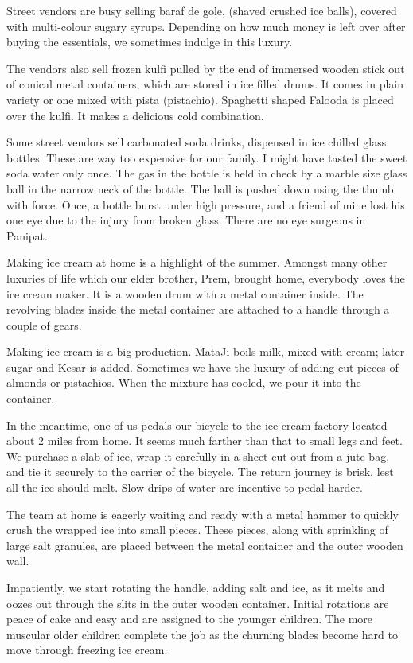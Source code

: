 Street vendors are busy selling baraf de gole, (shaved crushed ice balls),
covered with multi-colour sugary syrups. Depending on how much money is
left over after buying the essentials, we sometimes indulge in this
luxury. 
 
The vendors also sell frozen kulfi pulled by the end of immersed wooden
stick out of conical metal containers, which are stored in ice filled
drums. It comes in plain variety or one mixed with pista (pistachio).
Spaghetti shaped Falooda is placed over the kulfi. It makes a delicious
cold combination. 
 
Some street vendors sell carbonated soda drinks, dispensed in ice chilled
glass bottles. These are way too expensive for our family. I might have
tasted the sweet soda water only once. The gas in the bottle is held in
check by a marble size glass ball in the narrow neck of the bottle. The
ball is pushed down using the thumb with force. Once, a bottle burst under
high pressure, and a friend of mine lost his one eye due to the injury
from broken glass. There are no eye surgeons in Panipat. 
 
Making ice cream at home is a highlight of the summer. Amongst many other
luxuries of life which our elder brother, Prem, brought home, everybody
loves the ice cream maker. It is a wooden drum with a metal container
inside. The revolving blades inside the metal container are attached to
a handle through a couple of gears.
 
Making ice cream is a big production. MataJi boils milk, mixed with cream;
later sugar and Kesar is added. Sometimes we have the luxury of adding cut
pieces of almonds or pistachios. When the mixture has cooled, we pour it
into the container. 

In the meantime, one of us pedals our bicycle to the ice cream factory
located about 2 miles from home. It seems much farther than that to small
legs and feet. We purchase a slab of ice, wrap it carefully in a sheet cut
out from a jute bag, and tie it securely to the carrier of the bicycle.
The return journey is brisk, lest all the ice should melt. Slow drips of
water are incentive to pedal harder. 
 
The team at home is eagerly waiting and ready with a metal hammer to
quickly crush the wrapped ice into small pieces. These pieces, along with
sprinkling of large salt granules, are placed between the metal container
and the outer wooden wall. 

Impatiently, we start rotating the handle, adding salt and ice, as it
melts and oozes out through the slits in the outer wooden container.
Initial rotations are peace of cake and easy and are assigned to the
younger children. The more muscular older children complete the job as the
churning blades become hard to move through freezing ice cream. 
 

